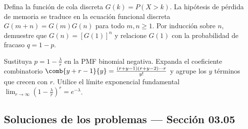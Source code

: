 \begin{sugerencia}
	\label{sug:3.5.9}
	Defina la función de cola discreta $G(k) = P(X > k)$. La hipótesis de pérdida de memoria se traduce en la ecuación funcional discreta $G(m+n) = G(m)G(n)$ para todo $m, n \ge 1$. Por inducción sobre $n$, demuestre que $G(n) = [G(1)]^n$ y relacione $G(1)$ con la probabilidad de fracaso $q = 1-p$.
\end{sugerencia}

\begin{sugerencia}
	\label{sug:3.5.10}
	Sustituya $p = 1 - \frac{\lambda}{r}$ en la PMF binomial negativa. Expanda el coeficiente combinatorio $\comb{y+r-1}{y} = \frac{(r+y-1)(r+y-2)\cdots r}{y!}$ y agrupe los $y$ términos que crecen con $r$. Utilice el límite exponencial fundamental $\lim_{r\to\infty} \left(1 - \frac{\lambda}{r}\right)^r = e^{-\lambda}$.
\end{sugerencia}


\subsection*{Soluciones de los problemas --- Sección 03.05}

